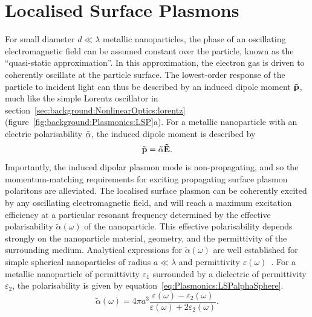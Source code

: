 \section{Localised Surface Plasmons}\label{sec:background:Plasmonics:LSP}

For small diameter $d \ll \lambda$ metallic nanoparticles, the phase of an oscillating electromagnetic field can be assumed constant over the particle, known as the ``quasi-static approximation''. In this approximation, the electron gas is driven to coherently oscillate at the particle surface. The lowest-order response of the particle to incident light can thus be described by an induced dipole moment $\bf{\tilde p}$, much like the simple Lorentz oscillator in section~\ref{sec:background:NonlinearOptics:lorentz} (figure~\ref{fig:background:Plasmonics:LSP}a).
For a metallic nanoparticle with an electric polarisability $\bf{\tilde \alpha }$, the induced dipole moment is described by
\begin{equation}\label{eq:Plasmonics:LSPdipole}
    {\bf{\tilde p}} = {\bf{\tilde \alpha }}{\bf{\tilde E}}.
\end{equation}
Importantly, the induced dipolar plasmon mode is non-propagating, and so the momentum-matching requirements for exciting propagating surface plasmon polaritons are alleviated. The localised surface plasmon can be coherently excited by any oscillating electromagnetic field, and will reach a maximum excitation efficiency at a particular resonant frequency determined by the effective polarisability ${\tilde \alpha }(\omega)$ of the nanoparticle.
This effective polarisability depends strongly on the nanoparticle material, geometry, and the permittivity of the surrounding medium.
Analytical expressions for ${\tilde \alpha }(\omega)$ are well established for simple spherical nanoparticles of radius $a \ll \lambda$ and permittivity $\varepsilon(\omega)$~\cite{Maier2007, Collins2017}.
For a metallic nanoparticle of permittivity $\varepsilon_1$ surrounded by a dielectric of permittivity $\varepsilon_2$, the polarisability is given by equation~\ref{eq:Plasmonics:LSPalphaSphere}. 
\begin{equation}\label{eq:Plasmonics:LSPalphaSphere}
    {\tilde \alpha}(\omega) = 4\pi a^3 \frac{\varepsilon (\omega) - \varepsilon_2 (\omega)}{\varepsilon (\omega) + 2\varepsilon_2 (\omega)}.
\end{equation}
